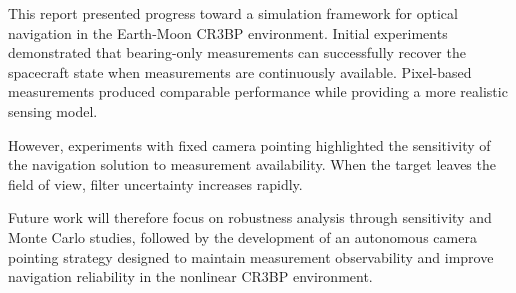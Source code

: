 \documentclass[twocolumn]{article}
\begin{document}
This report presented progress toward a simulation
framework for optical navigation in the Earth-Moon
CR3BP environment. Initial experiments demonstrated
that bearing-only measurements can successfully recover
the spacecraft state when measurements are continuously
available. Pixel-based measurements produced comparable
performance while providing a more realistic sensing
model.

However, experiments with fixed camera pointing
highlighted the sensitivity of the navigation solution
to measurement availability. When the target leaves the
field of view, filter uncertainty increases rapidly.

Future work will therefore focus on robustness analysis
through sensitivity and Monte Carlo studies, followed by
the development of an autonomous camera pointing strategy
designed to maintain measurement observability and
improve navigation reliability in the nonlinear CR3BP
environment. 






\end{document}
